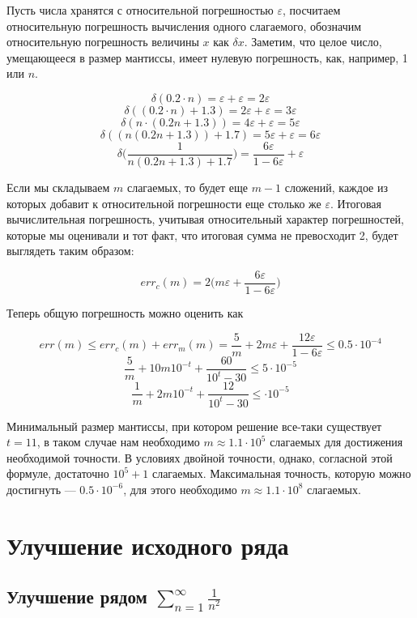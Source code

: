 \documentclass[11pt,a4paper,oneside]{article}
\begin{document}
Пусть числа хранятся с относительной погрешностью $\varepsilon$, посчитаем относительную погрешность вычисления одного слагаемого, обозначим относительную погрешность величины $x$ как $\delta x$. Заметим, что целое число, умещающееся в размер мантиссы, имеет нулевую погрешность, как, например, 1 или $n$.

$$ \delta (0.2 \cdot n) = \varepsilon + \varepsilon = 2 \varepsilon $$
$$ \delta ((0.2 \cdot n) + 1.3) = 2 \varepsilon + \varepsilon = 3 \varepsilon $$
$$ \delta (n \cdot (0.2 n + 1.3)) = 4 \varepsilon + \varepsilon = 5 \varepsilon $$
$$ \delta ((n (0.2 n + 1.3)) + 1.7) = 5 \varepsilon + \varepsilon = 6 \varepsilon $$
$$ \delta \biggr( \frac{1}{n (0.2 n + 1.3) + 1.7} \biggr)
	= \frac{6 \varepsilon}{1 - 6 \varepsilon} + \varepsilon $$
	
Если мы складываем $m$ слагаемых, то будет еще $m - 1$ сложений, каждое из которых добавит к относительной погрешности еще столько же $\varepsilon$. Итоговая вычислительная погрешность, учитывая относительный характер погрешностей, которые мы оценивали и тот факт, что итоговая сумма не превосходит 2, будет выглядеть таким образом:

$$ err_{c}(m) = 2 \biggr(m\varepsilon + \frac{6 \varepsilon}{1 - 6 \varepsilon}\biggr) $$
	
Теперь общую погрешность можно оценить как

$$ err(m) \le err_{c}(m) + err_{m}(m)
	= \frac{5}{m} + 2m \varepsilon + \frac{12 \varepsilon}{1 - 6 \varepsilon}
	\le 0.5 \cdot 10^{-4} $$
$$ \frac{5}{m} + 10 m 10^{-t} + \frac{60}{10^{t} - 30} \le 5 \cdot 10^{-5} $$
$$ \frac{1}{m} + 2 m 10^{-t} + \frac{12}{10^{t} - 30} \le \cdot 10^{-5} $$

Минимальный размер мантиссы, при котором решение все-таки существует $t = 11$, в таком случае нам необходимо $m \approx 1.1 \cdot 10^5 $ слагаемых для достижения необходимой точности. В условиях двойной точности, однако, согласной этой формуле, достаточно $10^5 + 1$ слагаемых. Максимальная точность, которую можно достигнуть --- $0.5 \cdot 10^{-6}$, для этого необходимо $m \approx 1.1 \cdot 10^8$ слагаемых.

\section{Улучшение исходного ряда}

\subsection{Улучшение рядом $ \sum_{n = 1}^{\infty} \frac{1}{n^2} $}
	
\end{document}

